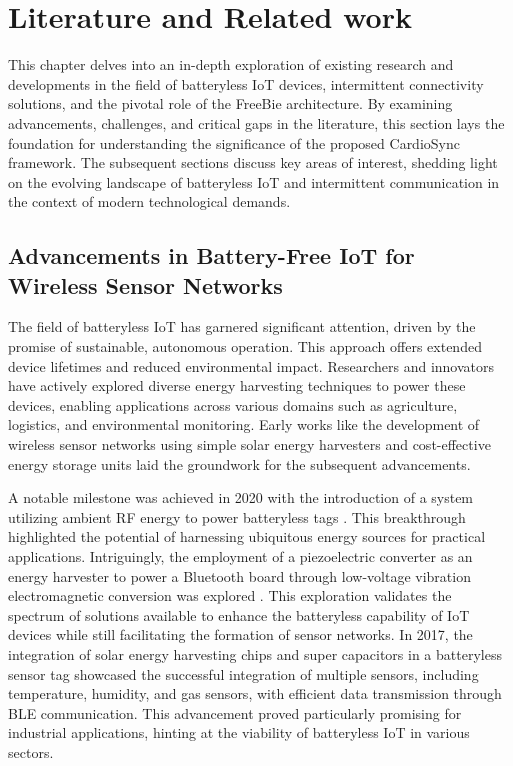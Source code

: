 \chapter{Literature and Related work}
This chapter delves into an in-depth exploration of existing research and developments in the field of batteryless IoT devices, intermittent connectivity solutions, and the pivotal role of the FreeBie architecture. By examining advancements, challenges, and critical gaps in the literature, this section lays the foundation for understanding the significance of the proposed CardioSync framework. The subsequent sections discuss key areas of interest, shedding light on the evolving landscape of batteryless IoT and intermittent communication in the context of modern technological demands.

\section{Advancements in Battery-Free IoT for Wireless Sensor Networks}
The field of batteryless IoT has garnered significant attention, driven by the promise of sustainable, autonomous operation. This approach offers extended device lifetimes and reduced environmental impact. Researchers and innovators have actively explored diverse energy harvesting techniques to power these devices, enabling applications across various domains such as agriculture, logistics, and environmental monitoring. Early works like the development of wireless sensor networks using simple solar energy harvesters and cost-effective energy storage units \cite{4394148} laid the groundwork for the subsequent advancements.

\noindent A notable milestone was achieved in 2020 with the introduction of a system utilizing ambient RF energy to power batteryless tags \cite{10.1145/3386901.3396604}. This breakthrough highlighted the potential of harnessing ubiquitous energy sources for practical applications. Intriguingly, the employment of a piezoelectric converter as an energy harvester to power a Bluetooth board through low-voltage vibration electromagnetic conversion was explored \cite{9221051}. This exploration validates the spectrum of solutions available to enhance the batteryless capability of IoT devices while still facilitating the formation of sensor networks. In 2017, the integration of solar energy harvesting chips and super capacitors in a batteryless sensor tag \cite{7990978} showcased the successful integration of multiple sensors, including temperature, humidity, and gas sensors, with efficient data transmission through BLE communication. This advancement proved particularly promising for industrial applications, hinting at the viability of batteryless IoT in various sectors.

